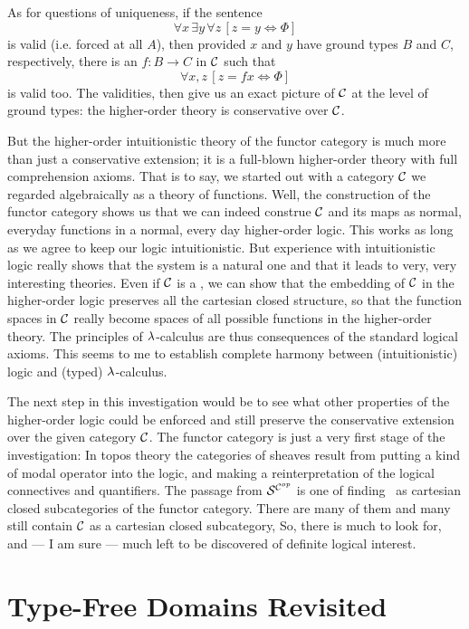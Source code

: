 As for questions of uniqueness, if the sentence
$$\forall x\, \exists y\, \forall z\, [z = y \iff \Phi]$$
is valid (i.e. forced at all $A$), then provided $x$ and $y$ have ground types $B$ and $C$, respectively, there is an $f : B\to C$ in $\mathcal C$ such that
$$\forall x,z\, [z = fx \iff \Phi]$$
is valid too. The validities, then give us an exact picture of $\mathcal C$ at the level of ground types: the higher-order theory is conservative over $\mathcal C$.

But the higher-order intuitionistic theory of the functor category is much more than just a conservative extension; it is a full-blown higher-order theory with full comprehension axioms. That is to say, we started out with a category $\mathcal C$ we regarded algebraically as a theory of functions. Well, the construction of the functor category shows us that we can indeed construe $\mathcal C$ and its maps as normal, everyday functions in a normal, every­ day higher-order logic. This works as long as we agree to keep our logic intuitionistic. But experience with intuitionistic
logic really shows that the system is a natural one and that it
leads to very, very interesting theories. Even if $\mathcal C$ is a \ccc, we can show that the embedding of $\mathcal C$ in the higher-order
logic preserves all the cartesian closed structure, so that the function spaces in $\mathcal C$ really become spaces of all possible func­tions in the higher-order theory. The principles of $\lambda$-calculus are thus consequences of the standard logical axioms. This seems to me to establish complete harmony between (intuitionis­tic) logic and (typed) $\lambda$-calculus.

The next step in this investigation would be to see what other properties of the higher-order logic could be enforced and still preserve the conservative extension over the given cate­gory $\mathcal C$. The functor category is just a very first stage of the investigation: In topos theory the categories of sheaves result from putting a kind of modal operator into the logic, and making a reinterpretation of the logical connectives and quantifiers.
The passage from $\mathcal S^{\mathcal C^{op}}$ is one of finding \ccc\ as cartesian
closed subcategories of the functor category. There are many of them and many still contain $\mathcal C$ as a  cartesian closed subcategory, So, there is much to look for, and --- I am sure --- much left to be discovered of definite logical interest. 

\section{Type-Free Domains Revisited}

